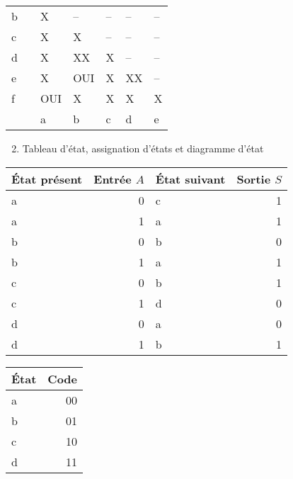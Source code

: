 \documentclass[letter, oneside]{book}
\begin{document}
\begin{itemize}
\begin{itemize}
\begin{center}
\begin{tabular}{lllllll}
b &  & X & -- & -- & -- & --\\[0pt]
c &  & X & X & -- & -- & --\\[0pt]
d &  & X & XX & X & -- & --\\[0pt]
e &  & X & OUI & X & XX & --\\[0pt]
f &  & OUI & X & X & X & X\\[0pt]
\hline
 &  & a & b & c & d & e\\[0pt]
\end{tabular}
\end{center}

\begin{enumerate}
\setcounter{enumi}{1}
\item Tableau d'état, assignation d'états et diagramme d'état
\end{enumerate}

\begin{center}
\begin{tabular}{lrlr}
État présent & Entrée \(A\) & État suivant & Sortie \(S\)\\[0pt]
\hline
a & 0 & c & 1\\[0pt]
a & 1 & a & 1\\[0pt]
b & 0 & b & 0\\[0pt]
b & 1 & a & 1\\[0pt]
c & 0 & b & 1\\[0pt]
c & 1 & d & 0\\[0pt]
d & 0 & a & 0\\[0pt]
d & 1 & b & 1\\[0pt]
\end{tabular}
\end{center}

\begin{center}
\begin{tabular}{lr}
État & Code\\[0pt]
\hline
a & 00\\[0pt]
b & 01\\[0pt]
c & 10\\[0pt]
d & 11\\[0pt]
\end{tabular}
\end{center}

\begin{center}

\end{center}


\end{itemize}
\end{itemize}
\end{document}
